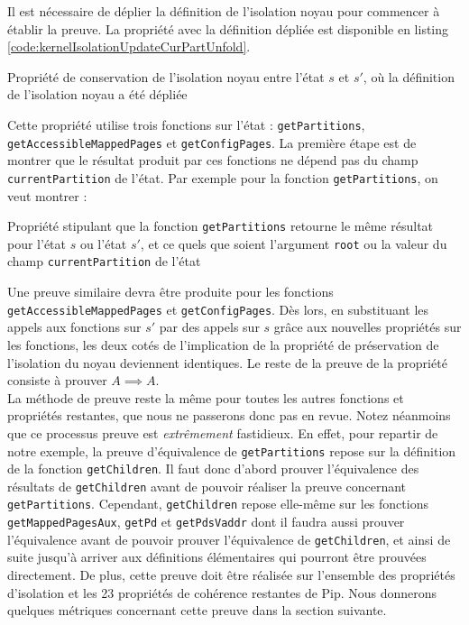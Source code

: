			Il est nécessaire de déplier la définition de l'isolation noyau pour commencer à établir la preuve. La propriété avec la définition dépliée est disponible en listing \ref{code:kernelIsolationUpdateCurPartUnfold}.

			\begin{listing}[!ht]
				\caption{Propriété de conservation de l'isolation noyau entre l'état $s$ et $s'$, où la définition de l'isolation noyau a été dépliée}
				\label{code:kernelIsolationUpdateCurPartUnfold}
			\end{listing}

			Cette propriété utilise trois fonctions sur l'état : \texttt{getPartitions}, \texttt{getAccessibleMappedPages} et \texttt{getConfigPages}. La première étape est de montrer que le résultat produit par ces fonctions ne dépend pas du champ \texttt{currentPartition} de l'état. Par exemple pour la fonction \texttt{getPartitions}, on veut montrer :

			\begin{listing}[!ht]
				\caption{Propriété stipulant que la fonction \texttt{getPartitions} retourne le même résultat pour l'état $s$ ou l'état $s'$, et ce quels que soient l'argument \texttt{root} ou la valeur du champ \texttt{currentPartition} de l'état}
				\label{code:partitionTreeRemains}
			\end{listing}

			Une preuve similaire devra être produite pour les fonctions \texttt{getAccessibleMappedPages} et \texttt{getConfigPages}. Dès lors, en substituant les appels aux fonctions sur $s'$ par des appels sur $s$ grâce aux nouvelles propriétés sur les fonctions, les deux cotés de l'implication de la propriété de préservation de l'isolation du noyau deviennent identiques. Le reste de la preuve de la propriété consiste à prouver $A \implies A$.\\

			La méthode de preuve reste la même pour toutes les autres fonctions et propriétés restantes, que nous ne passerons donc pas en revue. Notez néanmoins que ce processus preuve est \emph{extrêmement} fastidieux. En effet, pour repartir de notre exemple, la preuve d'équivalence de \texttt{getPartitions} repose sur la définition de la fonction \texttt{getChildren}. Il faut donc d'abord prouver l'équivalence des résultats de \texttt{getChildren} avant de pouvoir réaliser la preuve concernant \texttt{getPartitions}. Cependant, \texttt{getChildren} repose elle-même sur les fonctions \texttt{getMappedPagesAux}, \texttt{getPd} et \texttt{getPdsVaddr} dont il faudra aussi prouver l'équivalence avant de pouvoir prouver l'équivalence de \texttt{getChildren}, et ainsi de suite jusqu'à arriver aux définitions élémentaires qui pourront être prouvées directement. De plus, cette preuve doit être réalisée sur l'ensemble des propriétés d'isolation et les 23 propriétés de cohérence restantes de Pip. Nous donnerons quelques métriques concernant cette preuve dans la section suivante.

